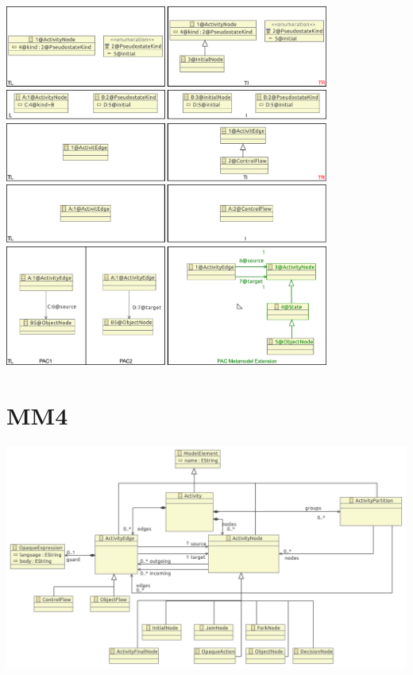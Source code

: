 \documentclass[a4paper,10pt]{article}
\begin{document}
\includegraphics[width=0.8\textwidth]{3/mm3_enum_to_subclass}\\
\includegraphics[width=0.8\textwidth]{3/mm3_enum_to_subclass_m}\\

\includegraphics[width=0.8\textwidth]{3/mm3_introduce_subclass}\\
\includegraphics[width=0.8\textwidth]{3/mm3_introduce_subclass_m}\\
\includegraphics[width=0.8\textwidth]{3/mm3_introduce_subclass_pac}\\

\section{MM4}

\includegraphics[width=\textwidth]{4/original_minimal_metamodel_4}
\end{document}
